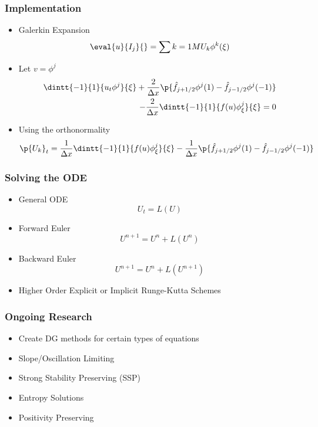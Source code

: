 \documentclass[10pt]{beamer}
\begin{document}
  \begin{frame}
    \frametitle{Implementation}
    \begin{itemize}
      \item Galerkin Expansion
        \[
          \eval{u}{I_j}{} = \sum{k = 1}{M}{U_k \phi^k(\xi)}
        \]

      \item Let $v = \phi^j$
        \begin{align*}
          \dintt{-1}{1}{u_t \phi^j}{\xi} + \frac{2}{\Delta x}\p{\hat{f}_{j+1/2} \phi^j(1) - \hat{f}_{j-1/2} \phi^j(-1)} \\
          - \frac{2}{\Delta x}\dintt{-1}{1}{f(u) \phi^j_{\xi}}{\xi} = 0
        \end{align*}
      \item Using the orthonormality
        \begin{align*}
          \p{U_k}_t = \frac{1}{\Delta x}\dintt{-1}{1}{f(u) \phi^j_{\xi}}{\xi} - \frac{1}{\Delta x}\p{\hat{f}_{j+1/2} \phi^j(1) - \hat{f}_{j-1/2} \phi^j(-1)}
        \end{align*}
    \end{itemize}
  \end{frame}

  \begin{frame}
    \frametitle{Solving the ODE}
    
    \begin{itemize}
      \item General ODE
        \[
          U_t = L(U)
        \]

      \item Forward Euler
        \[
          U^{n+1} = U^n + L(U^n)
        \]

      \item Backward Euler
        \[
          U^{n+1} = U^n + L(U^{n+1})
        \]

      \item Higher Order Explicit or Implicit Runge-Kutta Schemes
    \end{itemize}
  \end{frame}

  \begin{frame}
    \frametitle{Ongoing Research}
    \begin{itemize}
      \item Create DG methods for certain types of equations
      \item Slope/Oscillation Limiting
      \item Strong Stability Preserving (SSP)
      \item Entropy Solutions
      \item Positivity Preserving
    \end{itemize}
  \end{frame}
\end{document}
